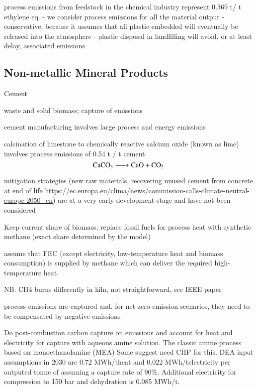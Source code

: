 process emissions from feedstock in the chemical industry represent 0.369 t\co / t ethylene eq.
- we consider process emissions for all the material output
- conservative, because it assumes that all plastic-embedded \co will eventually be released into the atmosphere
- plastic disposal in landfilling will avoid, or at least delay, associated \co emissions

\subsection{Non-metallic Mineral Products}

Cement


waste and solid biomass; capture of \co emissions

cement manufacturing involves large process and energy emissions

calcination of limestone to chemically reactive calcium oxide (known as lime)
involves process emissions of 0.54 t \ce{\co} / t cement
\begin{equation}
    \ce{CaCO3 -> CaO + \co}
\end{equation}

mitigation strategies (new raw materials, recovering unused cement from concrete at end of life \url{https://ec.europa.eu/clima/news/commission-calls-climate-neutral-europe-2050_en})
are at a very early development stage and have not been considered

Keep current share of biomass; replace fossil fuels for process heat with
synthetic methane (exact share determined by the model)

assume that FEC (except electricity, low-temperature heat and biomass consumption)
is supplied by methane which can deliver the required high-temperature heat

NB: CH4 burns differently in kiln, not straightforward, see IEEE paper

process emissions are captured and, for net-zero emission scenarios,
they need to be compensated by negative emissions

Do post-combustion carbon capture on emissions and account for heat and
electricity for capture with aqueous amine solution. The classic amine process
based on monoethanolamine (MEA) Some suggest need CHP for this. DEA input
assumptions in 2030 are 0.72 MWh/t\co heat and 0.022 MWh/t\co electricity
per outputed tonne of \co assuming a capture rate of 90\%. Additional
electricity for \co compression to 150 bar and dehydration is 0.085
MWh/t\co.

